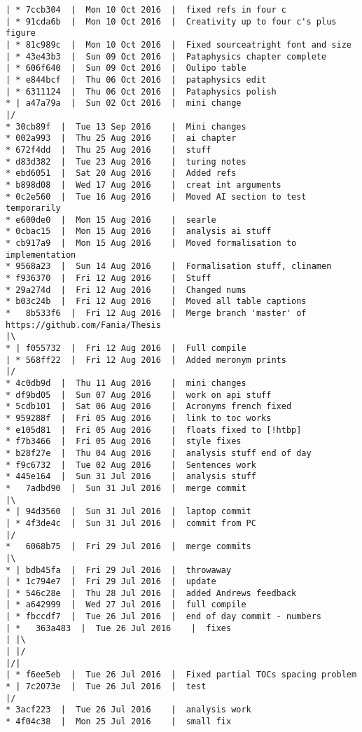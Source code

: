 \begin{verbatim}
| * 7ccb304  |  Mon 10 Oct 2016	 |  fixed refs in four c
| * 91cda6b  |  Mon 10 Oct 2016	 |  Creativity up to four c's plus figure
| * 81c989c  |  Mon 10 Oct 2016	 |  Fixed sourceatright font and size
| * 43e43b3  |  Sun 09 Oct 2016	 |  Pataphysics chapter complete
| * 606f640  |  Sun 09 Oct 2016	 |  Oulipo table
| * e844bcf  |  Thu 06 Oct 2016	 |  pataphysics edit
| * 6311124  |  Thu 06 Oct 2016	 |  Pataphysics polish
* | a47a79a  |  Sun 02 Oct 2016	 |  mini change
|/  
* 30cb89f  |  Tue 13 Sep 2016	 |  Mini changes
* 002a993  |  Thu 25 Aug 2016	 |  ai chapter
* 672f4dd  |  Thu 25 Aug 2016	 |  stuff
* d83d382  |  Tue 23 Aug 2016	 |  turing notes
* ebd6051  |  Sat 20 Aug 2016	 |  Added refs
* b898d08  |  Wed 17 Aug 2016	 |  creat int arguments
* 0c2e560  |  Tue 16 Aug 2016	 |  Moved AI section to test temporarily
* e600de0  |  Mon 15 Aug 2016	 |  searle
* 0cbac15  |  Mon 15 Aug 2016	 |  analysis ai stuff
* cb917a9  |  Mon 15 Aug 2016	 |  Moved formalisation to implementation
* 9568a23  |  Sun 14 Aug 2016	 |  Formalisation stuff, clinamen
* f936370  |  Fri 12 Aug 2016	 |  Stuff
* 29a274d  |  Fri 12 Aug 2016	 |  Changed nums
* b03c24b  |  Fri 12 Aug 2016	 |  Moved all table captions
*   8b533f6  |  Fri 12 Aug 2016	 |  Merge branch 'master' of https://github.com/Fania/Thesis
|\  
* | f055732  |  Fri 12 Aug 2016	 |  Full compile
| * 568ff22  |  Fri 12 Aug 2016	 |  Added meronym prints
|/  
* 4c0db9d  |  Thu 11 Aug 2016	 |  mini changes
* df9bd05  |  Sun 07 Aug 2016	 |  work on api stuff
* 5cdb101  |  Sat 06 Aug 2016	 |  Acronyms french fixed
* 959288f  |  Fri 05 Aug 2016	 |  link to toc works
* e105d81  |  Fri 05 Aug 2016	 |  floats fixed to [!htbp]
* f7b3466  |  Fri 05 Aug 2016	 |  style fixes
* b28f27e  |  Thu 04 Aug 2016	 |  analysis stuff end of day
* f9c6732  |  Tue 02 Aug 2016	 |  Sentences work
* 445e164  |  Sun 31 Jul 2016	 |  analysis stuff
*   7adbd90  |  Sun 31 Jul 2016	 |  merge commit
|\  
* | 94d3560  |  Sun 31 Jul 2016	 |  laptop commit
| * 4f3de4c  |  Sun 31 Jul 2016	 |  commit from PC
|/  
*   6068b75  |  Fri 29 Jul 2016	 |  merge commits
|\  
* | bdb45fa  |  Fri 29 Jul 2016	 |  throwaway
| * 1c794e7  |  Fri 29 Jul 2016	 |  update
| * 546c28e  |  Thu 28 Jul 2016	 |  added Andrews feedback
| * a642999  |  Wed 27 Jul 2016	 |  full compile
| * fbccdf7  |  Tue 26 Jul 2016	 |  end of day commit - numbers
| *   363a483  |  Tue 26 Jul 2016	 |  fixes
| |\  
| |/  
|/|   
| * f6ee5eb  |  Tue 26 Jul 2016	 |  Fixed partial TOCs spacing problem
* | 7c2073e  |  Tue 26 Jul 2016	 |  test
|/  
* 3acf223  |  Tue 26 Jul 2016	 |  analysis work
* 4f04c38  |  Mon 25 Jul 2016	 |  small fix

\end{verbatim}
